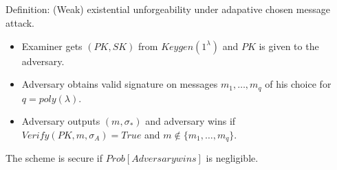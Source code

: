 \documentclass[psamsfonts]{amsart}
\begin{document}
\subsection{}

Definition: (Weak) existential unforgeability under adapative chosen message attack.

\begin{itemize}
  \item Examiner gets $(PK, SK)$ from $Keygen(1^\lambda)$ and $PK$ is given to the adversary.
  \item Adversary obtains valid signature on messages $m_1, \ldots, m_q$ of his choice for $q = poly(\lambda)$.
  \item Adversary outputs $(m, \sigma_{*})$ and adversary wins if $Verify(PK,m,\sigma_A) = True$ and $m \not \in \{m_1, \ldots, m_q \}$.
\end{itemize}

The scheme is secure if $Prob[Adversary wins]$ is negligible.
\end{document}
